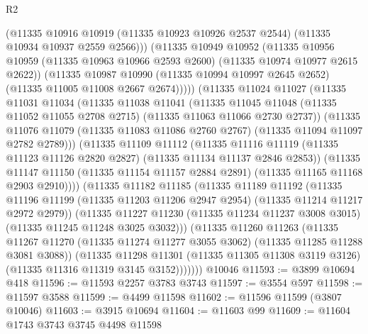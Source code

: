 \begin{lexlean}{R2}
\begin{coremodule}
              (@11335
                @10916
                @10919
                (@11335 @10923 @10926 @2537 @2544)
                (@11335 @10934 @10937 @2559 @2566)))
            (@11335
              @10949
              @10952
              (@11335
                @10956
                @10959
                (@11335 @10963 @10966 @2593 @2600)
                (@11335 @10974 @10977 @2615 @2622))
              (@11335
                @10987
                @10990
                (@11335 @10994 @10997 @2645 @2652)
                (@11335 @11005 @11008 @2667 @2674)))))
        (@11335
          @11024
          @11027
          (@11335
            @11031
            @11034
            (@11335
              @11038
              @11041
              (@11335
                @11045
                @11048
                (@11335 @11052 @11055 @2708 @2715)
                (@11335 @11063 @11066 @2730 @2737))
              (@11335
                @11076
                @11079
                (@11335 @11083 @11086 @2760 @2767)
                (@11335 @11094 @11097 @2782 @2789)))
            (@11335
              @11109
              @11112
              (@11335
                @11116
                @11119
                (@11335 @11123 @11126 @2820 @2827)
                (@11335 @11134 @11137 @2846 @2853))
              (@11335
                @11147
                @11150
                (@11335 @11154 @11157 @2884 @2891)
                (@11335 @11165 @11168 @2903 @2910))))
          (@11335
            @11182
            @11185
            (@11335
              @11189
              @11192
              (@11335
                @11196
                @11199
                (@11335 @11203 @11206 @2947 @2954)
                (@11335 @11214 @11217 @2972 @2979))
              (@11335
                @11227
                @11230
                (@11335 @11234 @11237 @3008 @3015)
                (@11335 @11245 @11248 @3025 @3032)))
            (@11335
              @11260
              @11263
              (@11335
                @11267
                @11270
                (@11335 @11274 @11277 @3055 @3062)
                (@11335 @11285 @11288 @3081 @3088))
              (@11335
                @11298
                @11301
                (@11335 @11305 @11308 @3119 @3126)
                (@11335 @11316 @11319 @3145 @3152)))))))
    @10046
@11593 := @3899 @10694 @418
@11596 := @11593 @2257 @3783 @3743
@11597 := @3554 @597
@11598 := @11597 @3588
@11599 := @4499 @11598
@11602 := @11596 @11599 (@3807 @10046)
@11603 := @3915 @10694
@11604 := @11603 @99
@11609 := @11604 @1743 @3743 @3745 @4498 @11598

\end{coremodule}
\end{lexlean}
